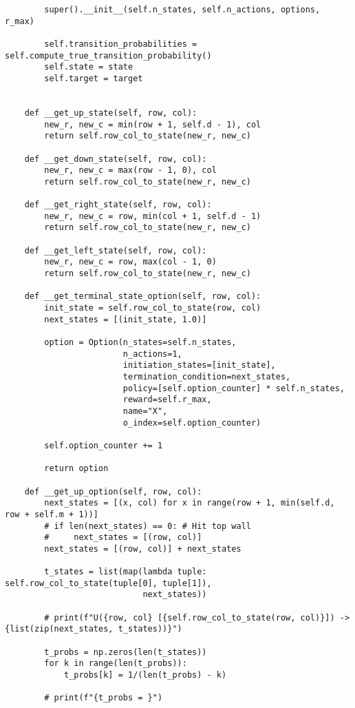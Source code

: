 \begin{verbatim}
        super().__init__(self.n_states, self.n_actions, options, r_max)

        self.transition_probabilities = self.compute_true_transition_probability()
        self.state = state
        self.target = target


    def __get_up_state(self, row, col):
        new_r, new_c = min(row + 1, self.d - 1), col
        return self.row_col_to_state(new_r, new_c)

    def __get_down_state(self, row, col):
        new_r, new_c = max(row - 1, 0), col
        return self.row_col_to_state(new_r, new_c)

    def __get_right_state(self, row, col):
        new_r, new_c = row, min(col + 1, self.d - 1)
        return self.row_col_to_state(new_r, new_c)

    def __get_left_state(self, row, col):
        new_r, new_c = row, max(col - 1, 0)
        return self.row_col_to_state(new_r, new_c)

    def __get_terminal_state_option(self, row, col):
        init_state = self.row_col_to_state(row, col)
        next_states = [(init_state, 1.0)]

        option = Option(n_states=self.n_states,
                        n_actions=1,
                        initiation_states=[init_state],
                        termination_condition=next_states,
                        policy=[self.option_counter] * self.n_states,
                        reward=self.r_max,
                        name="X",
                        o_index=self.option_counter)

        self.option_counter += 1

        return option

    def __get_up_option(self, row, col):
        next_states = [(x, col) for x in range(row + 1, min(self.d, row + self.m + 1))]
        # if len(next_states) == 0: # Hit top wall
        #     next_states = [(row, col)]
        next_states = [(row, col)] + next_states

        t_states = list(map(lambda tuple: self.row_col_to_state(tuple[0], tuple[1]),
                            next_states))

        # print(f"U({row, col} [{self.row_col_to_state(row, col)}]) -> {list(zip(next_states, t_states))}")

        t_probs = np.zeros(len(t_states))
        for k in range(len(t_probs)):
            t_probs[k] = 1/(len(t_probs) - k)

        # print(f"{t_probs = }")


\end{verbatim}
